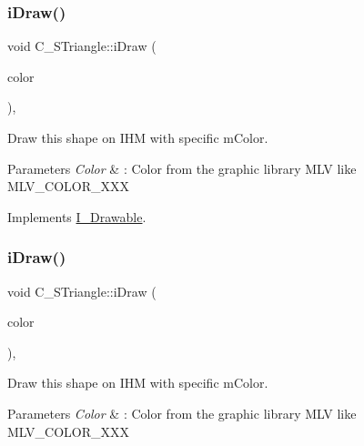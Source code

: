 \subsubsection{\texorpdfstring{i\+Draw()}{iDraw()}\hspace{0.1cm}{\footnotesize\ttfamily [3/4]}}
{\footnotesize\ttfamily void C\+\_\+\+S\+Triangle\+::i\+Draw (\begin{DoxyParamCaption}\item[{M\+L\+V\+\_\+\+Color}]{color }\end{DoxyParamCaption})\hspace{0.3cm}{\ttfamily [override]}, {\ttfamily [virtual]}}



Draw this shape on I\+HM with specific m\+Color. 


\begin{DoxyParams}{Parameters}
{\em Color} & \+: Color from the graphic library M\+LV like M\+L\+V\+\_\+\+C\+O\+L\+O\+R\+\_\+\+X\+XX \\
\hline
\end{DoxyParams}


Implements \hyperlink{classI__Drawable_a25f6474325614c451a91f019e5fe8010}{I\+\_\+\+Drawable}.

\mbox{\label{classC__STriangle_ad003b932a467de60b814d897fda38390}} 
\subsubsection{\texorpdfstring{i\+Draw()}{iDraw()}\hspace{0.1cm}{\footnotesize\ttfamily [4/4]}}
{\footnotesize\ttfamily void C\+\_\+\+S\+Triangle\+::i\+Draw (\begin{DoxyParamCaption}\item[{M\+L\+V\+\_\+\+Color}]{color }\end{DoxyParamCaption})\hspace{0.3cm}{\ttfamily [override]}, {\ttfamily [virtual]}}



Draw this shape on I\+HM with specific m\+Color. 


\begin{DoxyParams}{Parameters}
{\em Color} & \+: Color from the graphic library M\+LV like M\+L\+V\+\_\+\+C\+O\+L\+O\+R\+\_\+\+X\+XX \\
\hline
\end{DoxyParams}


